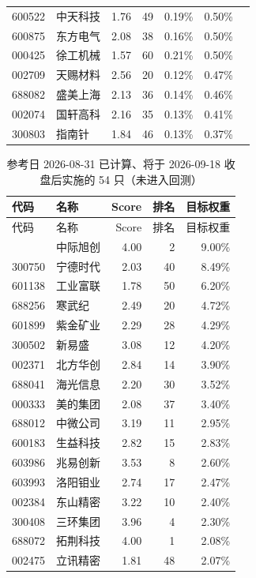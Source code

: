 \documentclass[11pt,a4paper]{article}
\begin{document}
{\begin{longtable}{@{}llrrrrl@{}}
600522 & 中天科技 & 1.76 & 49 & 0.19\% & 0.50\% &  \\
600875 & 东方电气 & 2.08 & 38 & 0.16\% & 0.50\% &  \\
000425 & 徐工机械 & 1.57 & 60 & 0.21\% & 0.50\% &  \\
002709 & 天赐材料 & 2.56 & 20 & 0.12\% & 0.47\% &  \\
688082 & 盛美上海 & 2.13 & 36 & 0.14\% & 0.46\% &  \\
002074 & 国轩高科 & 2.16 & 35 & 0.13\% & 0.41\% &  \\
300803 & 指南针 & 1.84 & 46 & 0.13\% & 0.37\% &  \\
\bottomrule
\end{longtable}
}

{\scriptsize
\begin{longtable}{@{}llrrr@{}}
\caption{参考日 2026-08-31 已计算、将于 2026-09-18 收盘后实施的 54 只（未进入回测）}\label{tab:pending}\\
\toprule
代码 & 名称 & Score & 排名 & 目标权重 \\
\midrule
\endfirsthead
\toprule
代码 & 名称 & Score & 排名 & 目标权重 \\
\midrule
\endhead
\bottomrule
\endfoot
\endlastfoot
300308 & 中际旭创 & 4.00 & 2 & 9.00\% \\
300750 & 宁德时代 & 2.03 & 40 & 8.49\% \\
601138 & 工业富联 & 1.78 & 50 & 6.20\% \\
688256 & 寒武纪 & 2.49 & 20 & 4.72\% \\
601899 & 紫金矿业 & 2.29 & 28 & 4.29\% \\
300502 & 新易盛 & 3.08 & 12 & 4.20\% \\
002371 & 北方华创 & 2.84 & 14 & 3.90\% \\
688041 & 海光信息 & 2.20 & 30 & 3.52\% \\
000333 & 美的集团 & 2.08 & 37 & 3.40\% \\
688012 & 中微公司 & 3.19 & 11 & 2.95\% \\
600183 & 生益科技 & 2.82 & 15 & 2.83\% \\
603986 & 兆易创新 & 3.53 & 8 & 2.60\% \\
603993 & 洛阳钼业 & 2.74 & 17 & 2.47\% \\
002384 & 东山精密 & 3.22 & 10 & 2.40\% \\
300408 & 三环集团 & 3.96 & 4 & 2.30\% \\
688072 & 拓荆科技 & 4.00 & 1 & 2.08\% \\
002475 & 立讯精密 & 1.81 & 48 & 2.07\% \\

\end{longtable}}
\end{document}
